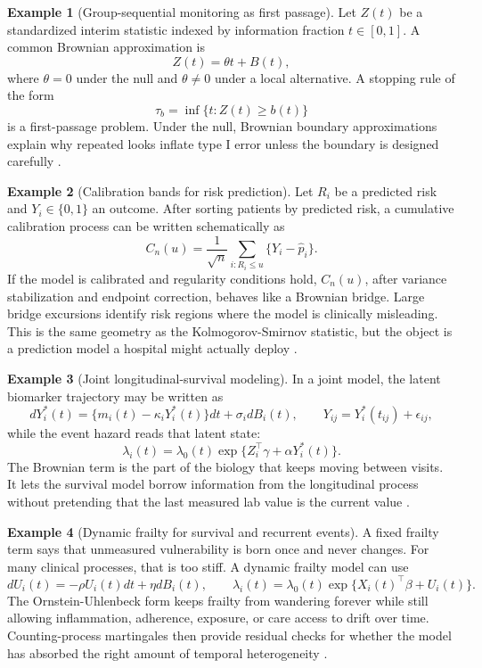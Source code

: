 \documentclass{article}
\theoremstyle{plain}
\theoremstyle{definition}
\newtheorem{example}{Example}
\begin{document}
\begin{example}[Group-sequential monitoring as first passage]
Let \(Z(t)\) be a standardized interim statistic indexed by information fraction \(t\in[0,1]\). A common Brownian approximation is
\[
Z(t)=\theta t+B(t),
\]
where \(\theta=0\) under the null and \(\theta\neq0\) under a local alternative. A stopping rule of the form
\[
\tau_b=\inf\{t:Z(t)\ge b(t)\}
\]
is a first-passage problem. Under the null, Brownian boundary approximations explain why repeated looks inflate type I error unless the boundary is designed carefully \citep{lan1983discrete,jennison2000group}.
\end{example}

\begin{example}[Calibration bands for risk prediction]
Let \(R_i\) be a predicted risk and \(Y_i\in\{0,1\}\) an outcome. After sorting patients by predicted risk, a cumulative calibration process can be written schematically as
\[
C_n(u)=\frac{1}{\sqrt n}\sum_{i:R_i\le u}\{Y_i-\widehat p_i\}.
\]
If the model is calibrated and regularity conditions hold, \(C_n(u)\), after variance stabilization and endpoint correction, behaves like a Brownian bridge. Large bridge excursions identify risk regions where the model is clinically misleading. This is the same geometry as the Kolmogorov-Smirnov statistic, but the object is a prediction model a hospital might actually deploy \citep{vandervaart1996weak,kosorok2008introduction}.
\end{example}

\begin{example}[Joint longitudinal-survival modeling]
In a joint model, the latent biomarker trajectory may be written as
\[
dY_i^\ast(t)=\{m_i(t)-\kappa_iY_i^\ast(t)\}dt+\sigma_i dB_i(t),
\qquad
Y_{ij}=Y_i^\ast(t_{ij})+\epsilon_{ij},
\]
while the event hazard reads that latent state:
\[
\lambda_i(t)=\lambda_0(t)\exp\{Z_i^\top\gamma+\alpha Y_i^\ast(t)\}.
\]
The Brownian term is the part of the biology that keeps moving between visits. It lets the survival model borrow information from the longitudinal process without pretending that the last measured lab value is the current value \citep{henderson2000joint,rizopoulos2012joint}.
\end{example}

\begin{example}[Dynamic frailty for survival and recurrent events]
A fixed frailty term says that unmeasured vulnerability is born once and never changes. For many clinical processes, that is too stiff. A dynamic frailty model can use
\[
dU_i(t)=-\rho U_i(t)dt+\eta dB_i(t),
\qquad
\lambda_i(t)=\lambda_0(t)\exp\{X_i(t)^\top\beta+U_i(t)\}.
\]
The Ornstein-Uhlenbeck form keeps frailty from wandering forever while still allowing inflammation, adherence, exposure, or care access to drift over time. Counting-process martingales then provide residual checks for whether the model has absorbed the right amount of temporal heterogeneity \citep{andersen1982cox,andersen1993statistical,fleming1991counting,aalen2008survival}.
\end{example}
\end{document}
